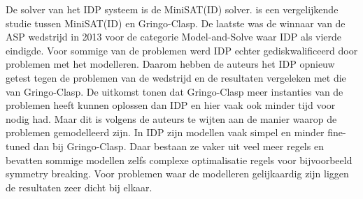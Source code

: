 De solver van het IDP systeem is de MiniSAT(ID) solver. \citep{de2014minisat} is een vergelijkende studie tussen MiniSAT(ID) en Gringo-Clasp. De laatste was de winnaar van de ASP wedstrijd in 2013 voor de categorie Model-and-Solve waar IDP als vierde eindigde. Voor sommige van de problemen werd IDP echter gediskwalificeerd door problemen met het modelleren. Daarom hebben de auteurs het IDP opnieuw getest tegen de problemen van de wedstrijd en de resultaten vergeleken met die van Gringo-Clasp. De uitkomst tonen dat Gringo-Clasp meer instanties van de problemen heeft kunnen oplossen dan IDP en hier vaak ook minder tijd voor nodig had. Maar dit is volgens de auteurs te wijten aan de manier waarop de problemen gemodelleerd zijn. In IDP zijn modellen vaak simpel en minder fine-tuned dan bij Gringo-Clasp. Daar bestaan ze vaker uit veel meer regels en bevatten sommige modellen zelfs complexe optimalisatie regels voor bijvoorbeeld symmetry breaking. Voor problemen waar de modelleren gelijkaardig zijn liggen de resultaten zeer dicht bij elkaar. 

